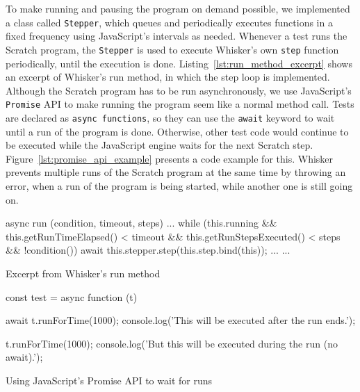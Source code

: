 To make running and pausing the program on demand possible, we implemented a class called \texttt{Stepper},
which queues and periodically executes functions in a fixed frequency using JavaScript's intervals as needed.
Whenever a test runs the Scratch program,
the \texttt{Stepper} is used to execute Whisker's own \texttt{step} function periodically,
until the execution is done.
Listing~\ref{lst:run_method_excerpt} shows an excerpt of Whisker's run method,
in which the step loop is implemented.
Although the Scratch program has to be run asynchronously, we use JavaScript's \texttt{Promise} API to make running the program seem like a normal method call.
Tests are declared as \texttt{async functions}, so they can use the \texttt{await} keyword to wait until a run of the program is done.
Otherwise, other test code would continue to be executed while the JavaScript engine waits for the next Scratch step.
Figure~\ref{lst:promise_api_example} presents a code example for this.
Whisker prevents multiple runs of the Scratch program at the same time by throwing an error,
when a run of the program is being started, while another one is still going on.
\parspace

\begin{listing}[htpb]
    \centering

    \begin{minipage}{.9\textwidth}
        \begin{javascriptcode}
            async run (condition, timeout, steps) {
                ...
                while (this.running &&
                       this.getRunTimeElapsed() < timeout &&
                       this.getRunStepsExecuted() < steps &&
                       !condition()) {
                    await this.stepper.step(this.step.bind(this));
                    ...
                }
                ...
            }
        \end{javascriptcode}
    \end{minipage}

    \caption{Excerpt from Whisker's run method}
    \label{lst:run_method_excerpt}
\end{listing}

\begin{listing}[htpb]
    \centering

    \begin{minipage}{.9\textwidth}
        \begin{javascriptcode}
            const test = async function (t) {
                await t.runForTime(1000);
                console.log('This will be executed after the run ends.');

                t.runForTime(1000);
                console.log('But this will be executed during the run (no await).');
            }
        \end{javascriptcode}
    \end{minipage}

    \caption{Using JavaScript's Promise API to wait for runs}
    \label{lst:promise_api_example}
\end{listing}

